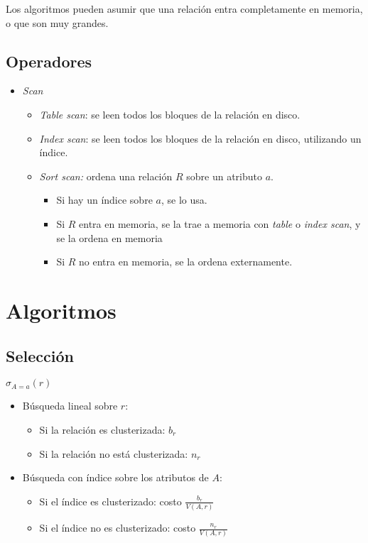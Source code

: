 \documentclass[a4paper, twoside]{article}
\begin{document}
Los algoritmos pueden asumir que una relación entra completamente en memoria, o que son muy grandes.

\subsection{Operadores}
\begin{itemize}
	\item \emph{Scan}
	\begin{itemize}
		\item \emph{Table scan}: se leen todos los bloques de la relación en disco.
		\item \emph{Index scan}: se leen todos los bloques de la relación en disco, utilizando un índice.
		\item \emph{Sort scan:} ordena una relación $R$ sobre un atributo $a$.
		\begin{itemize}
			\item Si hay un índice sobre $a$, se lo usa.
			\item Si $R$ entra en memoria, se la trae a memoria con \emph{table} o \emph{index scan}, y se la ordena en memoria
			\item Si $R$ no entra en memoria, se la ordena externamente.
		\end{itemize}
	\end{itemize}
\end{itemize}

\section{Algoritmos}
\subsection{Selección}
$\sigma_{A=a}(r)$

\begin{itemize}
	\item Búsqueda lineal sobre $r$:
	\begin{itemize}
		\item Si la relación es clusterizada: $b_{r}$
		\item Si la relación no está clusterizada: $n_{r}$
	\end{itemize}
	\item Búsqueda con índice sobre los atributos de $A$:
	\begin{itemize}
		\item Si el índice es clusterizado: costo $\frac{b_{r}}{V(A,r)}$
		\item Si el índice no es clusterizado: costo $\frac{n_{r}}{V(A,r)}$
	\end{itemize}
\end{itemize}
\end{document}
